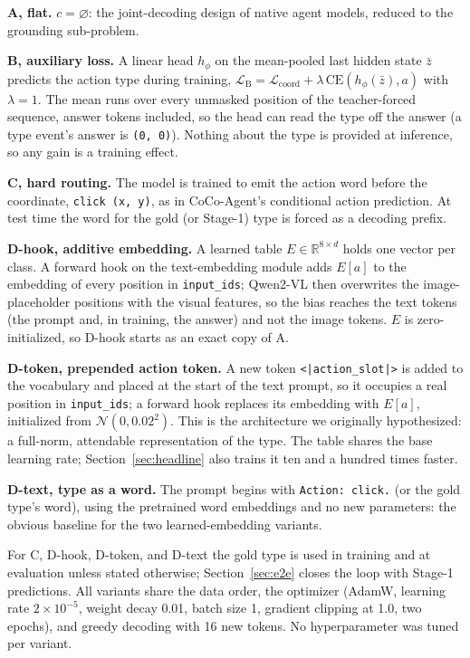 \documentclass{article}
\begin{document}
\textbf{A, flat.} $c=\varnothing$: the joint-decoding design of native agent models, reduced to the grounding sub-problem.

\textbf{B, auxiliary loss.} A linear head $h_\phi$ on the mean-pooled last hidden state $\bar z$ predicts the action type during training, $\mathcal{L}_{\mathrm{B}} = \mathcal{L}_{\mathrm{coord}} + \lambda\,\mathrm{CE}(h_\phi(\bar z), a)$ with $\lambda=1$. The mean runs over every unmasked position of the teacher-forced sequence, answer tokens included, so the head can read the type off the answer (a type event's answer is \texttt{(0, 0)}). Nothing about the type is provided at inference, so any gain is a training effect.

\textbf{C, hard routing.} The model is trained to emit the action word before the coordinate, \texttt{click (x, y)}, as in CoCo-Agent's conditional action prediction. At test time the word for the gold (or Stage-1) type is forced as a decoding prefix.

\textbf{D-hook, additive embedding.} A learned table $E \in \mathbb{R}^{8\times d}$ holds one vector per class. A forward hook on the text-embedding module adds $E[a]$ to the embedding of every position in \texttt{input\_ids}; Qwen2-VL then overwrites the image-placeholder positions with the visual features, so the bias reaches the text tokens (the prompt and, in training, the answer) and not the image tokens. $E$ is zero-initialized, so D-hook starts as an exact copy of A.

\textbf{D-token, prepended action token.} A new token \texttt{<|action\_slot|>} is added to the vocabulary and placed at the start of the text prompt, so it occupies a real position in \texttt{input\_ids}; a forward hook replaces its embedding with $E[a]$, initialized from $\mathcal{N}(0, 0.02^2)$. This is the architecture we originally hypothesized: a full-norm, attendable representation of the type. The table shares the base learning rate; Section~\ref{sec:headline} also trains it ten and a hundred times faster.

\textbf{D-text, type as a word.} The prompt begins with \texttt{Action: click.} (or the gold type's word), using the pretrained word embeddings and no new parameters: the obvious baseline for the two learned-embedding variants.

For C, D-hook, D-token, and D-text the gold type is used in training and at evaluation unless stated otherwise; Section~\ref{sec:e2e} closes the loop with Stage-1 predictions. All variants share the data order, the optimizer (AdamW, learning rate $2\times10^{-5}$, weight decay 0.01, batch size 1, gradient clipping at 1.0, two epochs), and greedy decoding with 16 new tokens. No hyperparameter was tuned per variant.
\end{document}
